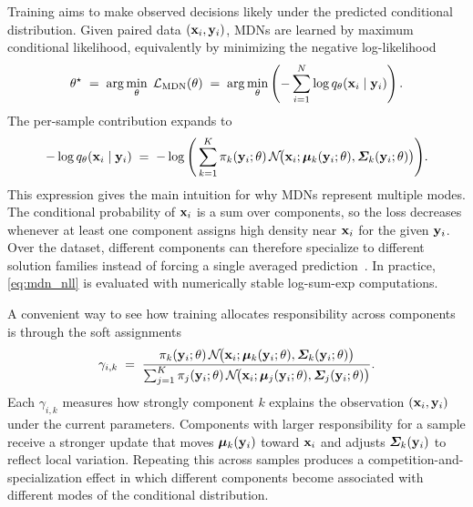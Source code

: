 Training aims to make observed decisions likely under the predicted conditional distribution. Given paired data $(\mathbf{x}_i,\mathbf{y}_i)$, MDNs are learned by maximum conditional likelihood, equivalently by minimizing the negative log-likelihood
\begin{equation}
  \theta^\star
  \;=\;
  \arg\min_{\theta}\;\mathcal{L}_{\mathrm{MDN}}(\theta)
  \;=\;
  \arg\min_{\theta}\left(
  -\sum_{i=1}^{N}\log q_\theta(\mathbf{x}_i\mid\mathbf{y}_i)
  \right).
  \label{eq:mdn_opt_problem}
\end{equation}
The per-sample contribution expands to
\begin{equation}
  -\log q_\theta(\mathbf{x}_i\mid\mathbf{y}_i)
  \;=\;
  -\log
  \Bigg(
    \sum_{k=1}^{K}\pi_k(\mathbf{y}_i;\theta)\,
    \mathcal{N}\!\big(\mathbf{x}_i;\boldsymbol{\mu}_k(\mathbf{y}_i;\theta),\boldsymbol{\Sigma}_k(\mathbf{y}_i;\theta)\big)
  \Bigg).
  \label{eq:mdn_nll}
\end{equation}
This expression gives the main intuition for why MDNs represent multiple modes. The conditional probability of $\mathbf{x}_i$ is a sum over components, so the loss decreases whenever at least one component assigns high density near $\mathbf{x}_i$ for the given $\mathbf{y}_i$. Over the dataset, different components can therefore specialize to different solution families instead of forcing a single averaged prediction~\cite{bishop1994mixture}. In practice, \eqref{eq:mdn_nll} is evaluated with numerically stable log-sum-exp computations.

A convenient way to see how training allocates responsibility across components is through the soft assignments
\begin{equation}
  \gamma_{i,k}
  \;=\;
  \frac{
    \pi_k(\mathbf{y}_i;\theta)\,
    \mathcal{N}\!\big(\mathbf{x}_i;\boldsymbol{\mu}_k(\mathbf{y}_i;\theta),\boldsymbol{\Sigma}_k(\mathbf{y}_i;\theta)\big)
  }{
    \sum_{j=1}^{K}\pi_j(\mathbf{y}_i;\theta)\,
    \mathcal{N}\!\big(\mathbf{x}_i;\boldsymbol{\mu}_j(\mathbf{y}_i;\theta),\boldsymbol{\Sigma}_j(\mathbf{y}_i;\theta)\big)
  }.
  \label{eq:mdn_responsibilities}
\end{equation}
Each $\gamma_{i,k}$ measures how strongly component $k$ explains the observation $(\mathbf{x}_i,\mathbf{y}_i)$ under the current parameters. Components with larger responsibility for a sample receive a stronger update that moves $\boldsymbol{\mu}_k(\mathbf{y}_i)$ toward $\mathbf{x}_i$ and adjusts $\boldsymbol{\Sigma}_k(\mathbf{y}_i)$ to reflect local variation. Repeating this across samples produces a competition-and-specialization effect in which different components become associated with different modes of the conditional distribution.

